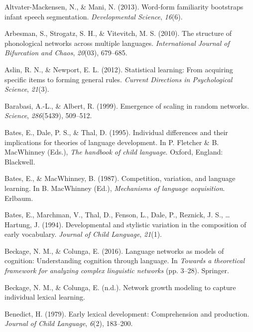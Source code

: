 \documentclass[english,,man,floatsintext]{apa6}
\begin{document}
\hypertarget{refs}{}
\leavevmode\hypertarget{ref-altvater2013}{}%
Altvater-Mackensen, N., \& Mani, N. (2013). Word-form familiarity bootstraps infant speech segmentation. \emph{Developmental Science}, \emph{16}(6).

\leavevmode\hypertarget{ref-arbesman2010}{}%
Arbesman, S., Strogatz, S. H., \& Vitevitch, M. S. (2010). The structure of phonological networks across multiple languages. \emph{International Journal of Bifurcation and Chaos}, \emph{20}(03), 679--685.

\leavevmode\hypertarget{ref-aslin2012}{}%
Aslin, R. N., \& Newport, E. L. (2012). Statistical learning: From acquiring specific items to forming general rules. \emph{Current Directions in Psychological Science}, \emph{21}(3).

\leavevmode\hypertarget{ref-barabasi99}{}%
Barabasi, A.-L., \& Albert, R. (1999). Emergence of scaling in random networks. \emph{Science}, \emph{286}(5439), 509--512.

\leavevmode\hypertarget{ref-bates1995}{}%
Bates, E., Dale, P. S., \& Thal, D. (1995). Individual differences and their implications for theories of language development. In P. Fletcher \& B. MacWhinney (Eds.), \emph{The handbook of child language}. Oxford, England: Blackwell.

\leavevmode\hypertarget{ref-bates1987}{}%
Bates, E., \& MacWhinney, B. (1987). Competition, variation, and language learning. In B. MacWhinney (Ed.), \emph{Mechanisms of language acquisition}. Erlbaum.

\leavevmode\hypertarget{ref-bates1994}{}%
Bates, E., Marchman, V., Thal, D., Fenson, L., Dale, P., Reznick, J. S., \ldots{} Hartung, J. (1994). Developmental and stylistic variation in the composition of early vocabulary. \emph{Journal of Child Language}, \emph{21}(1).

\leavevmode\hypertarget{ref-beckage2016}{}%
Beckage, N. M., \& Colunga, E. (2016). Language networks as models of cognition: Understanding cognition through language. In \emph{Towards a theoretical framework for analyzing complex linguistic networks} (pp. 3--28). Springer.

\leavevmode\hypertarget{ref-beckage}{}%
Beckage, N. M., \& Colunga, E. (n.d.). Network growth modeling to capture individual lexical learning.

\leavevmode\hypertarget{ref-benedict1979}{}%
Benedict, H. (1979). Early lexical development: Comprehension and production. \emph{Journal of Child Language}, \emph{6}(2), 183--200.
\end{document}
